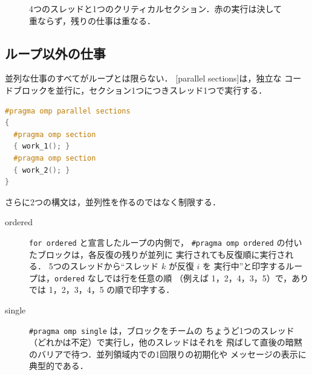 \documentclass[../main.tex]{subfiles}
\begin{document}
\begin{figure}[tb]
  \centering
  
  \caption{4つのスレッドと1つのクリティカルセクション．赤の実行は決して
    重ならず，残りの仕事は重なる．}
  \label{fig:l02-critical}
\end{figure}


\subsection{ループ以外の仕事}

並列な仕事のすべてがループとは限らない．
[parallel sections]は，独立な
コードブロックを並行に，セクション1つにつきスレッド1つで実行する．
\begin{lstlisting}[language=C++, numbers=none]
#pragma omp parallel sections
{
  #pragma omp section
  { work_1(); }
  #pragma omp section
  { work_2(); }
}
\end{lstlisting}
さらに2つの構文は，並列性を作るのではなく制限する．
\begin{description}
  \item[ordered]  \texttt{for ordered} と宣言したループの内側で，
    \texttt{\#pragma omp ordered} の付いたブロックは，各反復の残りが並列に
    実行されても反復順に実行される．  5つのスレッドから\enquote{スレッド $k$ が反復 $i$ を
    実行中}と印字するループは，\texttt{ordered} なしでは行を任意の順
    （例えば 1，2，4，3，5）で，ありでは 1，2，3，4，5 の順で印字する．
  \item[single]  \texttt{\#pragma omp single} は，ブロックをチームの
    ちょうど1つのスレッド（どれかは不定）で実行し，他のスレッドはそれを
    飛ばして直後の暗黙のバリアで待つ．並列領域内での1回限りの初期化や
    メッセージの表示に典型的である．
\end{description}
\end{document}
